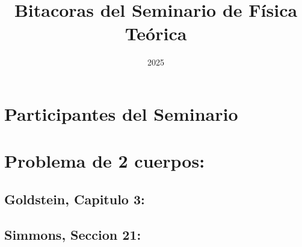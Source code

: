 \documentclass[11pt, spanish, open=any]{scrbook}
\title{Bitacoras del Seminario de Física Teórica}
\author{}
\date{2025}
\begin{document}
\frontmatter
\maketitle
\tableofcontents

\mainmatter

\chapter{Participantes del Seminario}
 


\chapter{Problema de 2 cuerpos:}

\section{Goldstein, Capitulo 3:}


\section{Simmons, Seccion 21:}



\backmatter

\printbibliography %
\end{document}
